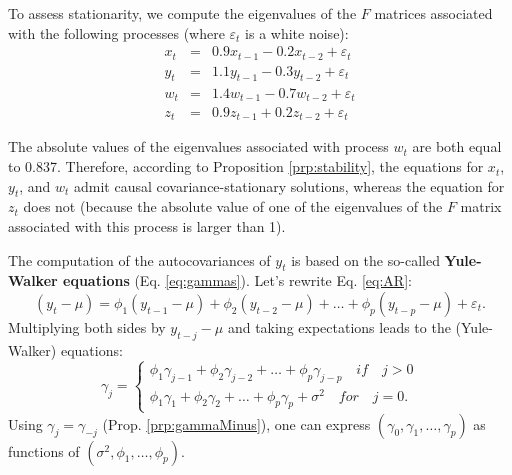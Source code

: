 \documentclass[
  11pt,
]{book}
\theoremstyle{definition}
\theoremstyle{definition}
\theoremstyle{definition}
\theoremstyle{definition}
\theoremstyle{remark}
\begin{document}
To assess stationarity, we compute the eigenvalues of the \(F\) matrices associated with the following processes (where \(\varepsilon_t\) is a white noise):
\begin{eqnarray*}
x_t &=& 0.9 x_{t-1} -0.2 x_{t-2} + \varepsilon_t\\
y_t &=& 1.1 y_{t-1} -0.3 y_{t-2} + \varepsilon_t\\
w_t &=& 1.4 w_{t-1} -0.7 w_{t-2} + \varepsilon_t\\
z_t &=& 0.9 z_{t-1} +0.2 z_{t-2} + \varepsilon_t
\end{eqnarray*}

\begin{table}[H]
\centering\begingroup\fontsize{10}{12}\selectfont

\endgroup{}
\end{table}

The absolute values of the eigenvalues associated with process \(w_t\) are both equal to 0.837. Therefore, according to Proposition \ref{prp:stability}, the equations for \(x_t\), \(y_t\), and \(w_t\) admit causal covariance-stationary solutions, whereas the equation for \(z_t\) does not (because the absolute value of one of the eigenvalues of the \(F\) matrix associated with this process is larger than 1).

The computation of the autocovariances of \(y_t\) is based on the so-called \textbf{Yule-Walker equations} (Eq. \eqref{eq:gammas}). Let's rewrite Eq. \eqref{eq:AR}:
\[
(y_t-\mu) = \phi_1 (y_{t-1}-\mu) + \phi_2 (y_{t-2}-\mu) + \dots + \phi_p (y_{t-p}-\mu) + \varepsilon_t.
\]
Multiplying both sides by \(y_{t-j}-\mu\) and taking expectations leads to the (Yule-Walker) equations:
\begin{equation}
\gamma_j = \left\{
\begin{array}{l}
\phi_1 \gamma_{j-1}+\phi_2 \gamma_{j-2}+ \dots + \phi_p \gamma_{j-p} \quad if \quad j>0\\
\phi_1 \gamma_{1}+\phi_2 \gamma_{2}+ \dots + \phi_p \gamma_{p} + \sigma^2 \quad for \quad j=0.
\end{array}
\right.\label{eq:gammas}
\end{equation}
Using \(\gamma_j = \gamma_{-j}\) (Prop. \ref{prp:gammaMinus}), one can express \((\gamma_0,\gamma_1,\dots,\gamma_{p})\) as functions of \((\sigma^2,\phi_1,\dots,\phi_p)\).
\end{document}
